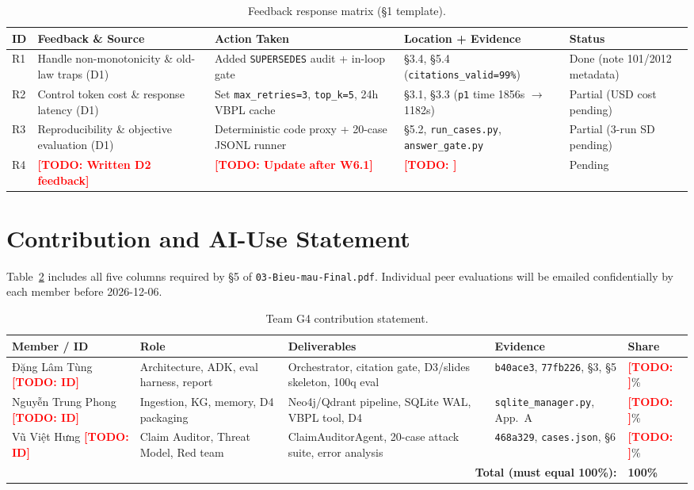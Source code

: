 \documentclass[sigconf,nonacm]{acmart}
\newcommand{\TODO}[1]{\textcolor{red}{\textbf{[TODO: #1]}}}
\begin{document}
\begin{table}[H]
\caption{Feedback response matrix (§1 template).}
\label{tab:feedback}
\scriptsize
\begin{tabular}{@{}p{0.5cm}p{1.9cm}p{2.0cm}p{2.1cm}p{0.9cm}@{}}
\toprule
\textbf{ID} & \textbf{Feedback \& Source} & \textbf{Action Taken} & \textbf{Location + Evidence} & \textbf{Status} \\
\midrule
R1 & Handle non-monotonicity \& old-law traps (D1) & Added \texttt{SUPERSEDES} audit + in-loop gate & §3.4, §5.4 (\texttt{citations\_valid=99\%}) & Done (note 101/2012 metadata) \\
R2 & Control token cost \& response latency (D1) & Set \texttt{max\_retries=3}, \texttt{top\_k=5}, 24h VBPL cache & §3.1, §3.3 (\texttt{p1} time 1856s $\to$ 1182s) & Partial (USD cost pending) \\
R3 & Reproducibility \& objective evaluation (D1) & Deterministic code proxy + 20-case JSONL runner & §5.2, \texttt{run\_cases.py}, \texttt{answer\_gate.py} & Partial (3-run SD pending) \\
R4 & \TODO{Written D2 feedback} & \TODO{Update after W6.1} & \TODO{} & Pending \\
\bottomrule
\end{tabular}
\end{table}

\section{Contribution and AI-Use Statement}
\label{app:contrib}

Table~\ref{tab:contrib} includes all five columns required by §5 of \texttt{03-Bieu-mau-Final.pdf}. Individual peer evaluations will be emailed confidentially by each member before 2026-12-06.

\begin{table}[H]
\caption{Team G4 contribution statement.}
\label{tab:contrib}
\scriptsize
\begin{tabular}{@{}p{1.8cm}p{1.6cm}p{1.8cm}p{1.6cm}p{0.6cm}@{}}
\toprule
\textbf{Member / ID} & \textbf{Role} & \textbf{Deliverables} & \textbf{Evidence} & \textbf{Share} \\
\midrule
Đặng Lâm Tùng \TODO{ID} & Architecture, ADK, eval harness, report & Orchestrator, citation gate, D3/slides skeleton, 100q eval & \texttt{b40ace3}, \texttt{77fb226}, §3, §5 & \TODO{}\% \\
Nguyễn Trung Phong \TODO{ID} & Ingestion, KG, memory, D4 packaging & Neo4j/Qdrant pipeline, SQLite WAL, VBPL tool, D4 & \texttt{sqlite\_manager.py}, App.~A & \TODO{}\% \\
Vũ Việt Hưng \TODO{ID} & Claim Auditor, Threat Model, Red team & ClaimAuditorAgent, 20-case attack suite, error analysis & \texttt{468a329}, \texttt{cases.json}, §6 & \TODO{}\% \\
\midrule
\multicolumn{4}{r}{\textbf{Total (must equal 100\%):}} & \textbf{100\%} \\
\bottomrule
\end{tabular}
\end{table}
\end{document}
